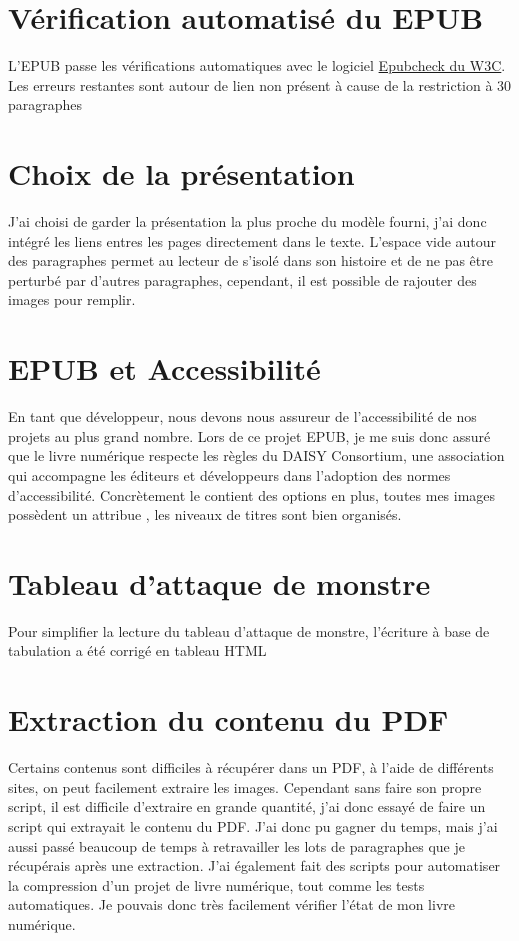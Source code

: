 \documentclass{article}
\begin{document}
\section{Vérification automatisé du EPUB}
L'EPUB passe les vérifications automatiques avec le logiciel \href{https://github.com/w3c/epubcheck}{Epubcheck du W3C}. Les erreurs restantes sont autour de lien non présent à cause de la restriction à 30 paragraphes

\section{Choix de la présentation}
J'ai choisi de garder la présentation la plus proche du modèle fourni, j'ai donc intégré les liens entres les pages directement dans le texte. L'espace vide autour des paragraphes permet au lecteur de s'isolé dans son histoire et de ne pas être perturbé par d'autres paragraphes, cependant, il est possible de rajouter des images pour remplir. 

\section{EPUB et Accessibilité}
En tant que développeur, nous devons nous assureur de l'accessibilité de nos projets au plus grand nombre. Lors de ce projet EPUB, je me suis donc assuré que le livre numérique respecte les règles du DAISY Consortium, une association qui accompagne les éditeurs et développeurs dans l'adoption des normes d'accessibilité. Concrètement le  contient des options en plus, toutes mes images possèdent un attribue , les niveaux de titres sont bien organisés.

\section{Tableau d'attaque de monstre}
Pour simplifier la lecture du tableau d'attaque de monstre, l'écriture à base de tabulation a été corrigé en tableau HTML

\section{Extraction du contenu du PDF}
Certains contenus sont difficiles à récupérer dans un PDF, à l'aide de différents sites, on peut facilement extraire les images. Cependant sans faire son propre script, il est difficile d'extraire en grande quantité, j'ai donc essayé de faire un script qui extrayait le contenu du PDF. J'ai donc pu gagner du temps, mais j'ai aussi passé beaucoup de temps à retravailler les lots de paragraphes que je récupérais après une extraction.
J'ai également fait des scripts pour automatiser la compression d'un projet de livre numérique, tout comme les tests automatiques. Je pouvais donc très facilement vérifier l'état de mon livre numérique.
\end{document}
